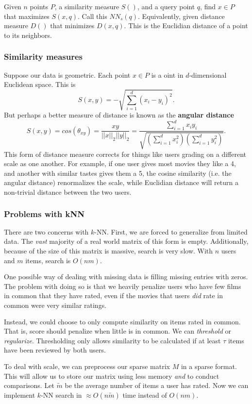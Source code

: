 \documentclass[titlepage, 12pt, leqno]{article}
\begin{document}
Given $n$ points $P$, a similarity measure $S()$, and a query point $q$, find
$x \in P$ that maximizes $S(x,q)$. Call this $NN_{s}(q)$. Equivalently, given 
distance measure $D()$ that minimizes $D(x,q)$. This is the Euclidian distance of
a point to its neighbors.

\subsubsection{Similarity measures}
Suppose our data is geometric. Each point $x \in P$ is a oint in $d$-dimensional
Euclidean space. This is
\[
S(x,y) = - \sqrt{\sum_{i=1}^{d}(x_{i}-y_{i})^{2}}.
\]
But perhaps a better measure of distance is known as the \textbf{angular distance}
\[
S(x,y) = cos(\theta_{xy}) = \frac{xy}{||x||_{2}||y||_{2}} = 
\frac{\sum_{i=1}^{d}x_{i}y_{i}}{\sqrt{\left(\sum_{i=1}^{d}x_{i}^{2}\right)
\left(\sum_{i=1}^{d}y_{i}^{2}\right)}}.
\]
This form of distance measure corrects for things like users grading on a
different scale as one another. For example, if one user gives most movies they
like a 4, and another with similar tastes gives them a 5, the cosine similarity
(i.e. the angular distance) renormalizes the scale, while Euclidian distance will
return a non-trivial distance between the two users.

\subsubsection{Problems with kNN}
There are two concerns with $k$-NN. First, we are forced to generalize from 
limited data. The \textit{vast} majority of a real world matrix of this form is
empty. Additionally, because of the size of this matrix is massive, search is
very slow. With $n$ users and $m$ items, search is $O(nm)$.

One possible way of dealing with missing data is filling missing entries with
zeros. The problem with doing so is that we heavily penalize users who have few
films in common that they have rated, even if the movies that users \textit{did}
rate in common were very similar ratings.

Instead, we could choose to only compute similarity on items rated in common.
That is, score should penalize when little is in common. We can \textit{threshold}
or \textit{regularize}. Thresholding only allows similarity to be calculated if
at least $\tau$ items have been reviewed by both users.

To deal with scale, we can preprocess our sparse matrix $M$ in a sparse format. 
This will allow us to store our matrix using less memory \textit{and} to conduct
comparisons. Let $\tilde{m}$ be the average number of items a user has rated.
Now we can implement $k$-NN search in $\approx O(n\tilde{m})$ time instead of
$O(nm)$.
\end{document}
